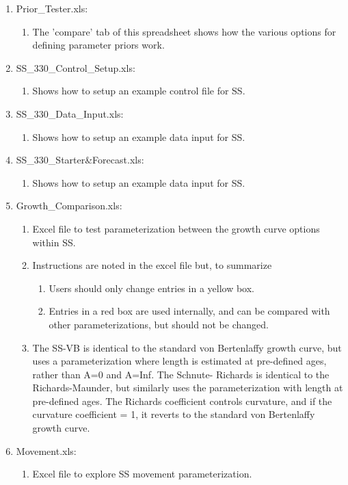 \begin{enumerate}
\begin{enumerate}
		\end{enumerate}
		\item Prior\_Tester.xls:
		\begin{enumerate}
			\item The 'compare' tab of this spreadsheet shows how the various options for defining parameter priors work.
		\end{enumerate}
		\item SS\_330\_Control\_Setup.xls:
		\begin{enumerate}
			\item Shows how to setup an example control file for SS.
		\end{enumerate}
		\item SS\_330\_Data\_Input.xls:
		\begin{enumerate}
			\item Shows how to setup an example data input for SS.
		\end{enumerate}
		\item SS\_330\_Starter\&Forecast.xls:
		\begin{enumerate}
			\item Shows how to setup an example data input for SS.
		\end{enumerate}
		\item Growth\_Comparison.xls: 
		\begin{enumerate}
			\item Excel file to test parameterization between the growth curve options within SS.
			\item Instructions are noted in the excel file but, to summarize
			\begin{enumerate}
				\item Users should only change entries in a yellow box.  
				\item Entries in a red box are used internally, and can be compared with other parameterizations, but should not be changed.
			\end{enumerate}
			\item The SS-VB is identical to the standard von Bertenlaffy growth curve, but uses a parameterization where length is estimated at pre-defined ages, rather than A=0 and A=Inf.  The Schnute- Richards is identical to the Richards-Maunder, but similarly uses the parameterization with length at pre-defined ages.  The Richards coefficient controls curvature, and if the curvature coefficient = 1, it reverts to the standard von Bertenlaffy growth curve. 
		\end{enumerate}
		\item Movement.xls:
		\begin{enumerate}
			\item Excel file to explore SS movement parameterization.
		\end{enumerate}
	\end{enumerate}
		
